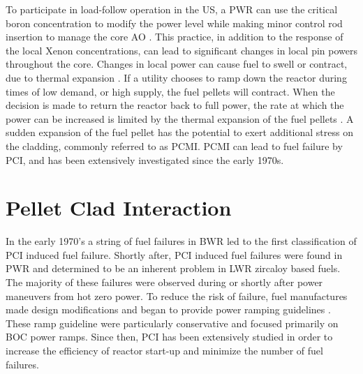 \documentclass[edeposit,fullpage]{uiucthesis2009}
\begin{document}
To participate in load-follow operation in the \gls{US}, a \gls{PWR} can use the critical boron concentration to modify the power level while making minor control rod insertion to manage the core \gls{AO} \cite{lokhov_technical_2011}.  
This practice, in addition to the response of the local Xenon concentrations, can lead to significant changes in local pin powers throughout the core.
Changes in local power can cause fuel to swell or contract, due to thermal expansion \cite{gartner_power_1984}. %
If a utility chooses to ramp down the reactor during times of low demand, or high supply, the fuel pellets will contract.
When the decision is made to return the reactor back to full power, the rate at which the power can be increased is limited by the thermal expansion of the fuel pellets \cite{gartner_power_1984}.
A sudden expansion of the fuel pellet has the potential to exert additional stress on the cladding, commonly referred to as \gls{PCMI}.
\gls{PCMI} can lead to fuel failure by \gls{PCI}, and has been extensively investigated since the early 1970s.

\section{Pellet Clad Interaction}

In the early 1970's a string of fuel failures in \gls{BWR} led to the first classification of \gls{PCI} induced fuel failure.  
Shortly after, \gls{PCI} induced fuel failures were found in \gls{PWR} and determined to be an inherent problem in \gls{LWR} zircaloy based fuels. %
The majority of these failures were observed during or shortly after power maneuvers from hot zero power.
To reduce the risk of failure, fuel manufactures made design modifications and began to provide power ramping guidelines \cite{kennard_pci_2016}.
These ramp guideline were particularly conservative and focused primarily on \gls{BOC} power ramps. 
Since then, \gls{PCI} has been extensively studied in order to increase the efficiency of reactor start-up and minimize the number of fuel failures.
 
\end{document}
